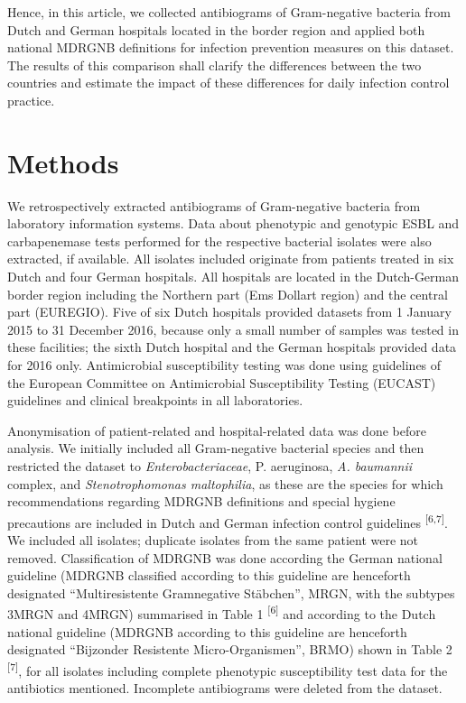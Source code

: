 \documentclass[
]{book}
\begin{document}
Hence, in this article, we collected antibiograms of Gram-negative bacteria from Dutch and German hospitals located in the border region and applied both national MDRGNB definitions for infection prevention measures on this dataset. The results of this comparison shall clarify the differences between the two countries and estimate the impact of these differences for daily infection control practice.

\hypertarget{methods-2}{%
\section{Methods}\label{methods-2}}

We retrospectively extracted antibiograms of Gram-negative bacteria from laboratory information systems. Data about phenotypic and genotypic ESBL and carbapenemase tests performed for the respective bacterial isolates were also extracted, if available. All isolates included originate from patients treated in six Dutch and four German hospitals. All hospitals are located in the Dutch-German border region including the Northern part (Ems Dollart region) and the central part (EUREGIO). Five of six Dutch hospitals provided datasets from 1 January 2015 to 31 December 2016, because only a small number of samples was tested in these facilities; the sixth Dutch hospital and the German hospitals provided data for 2016 only. Antimicrobial susceptibility testing was done using guidelines of the European Committee on Antimicrobial Susceptibility Testing (EUCAST) guidelines and clinical breakpoints in all laboratories.

Anonymisation of patient-related and hospital-related data was done before analysis. We initially included all Gram-negative bacterial species and then restricted the dataset to \emph{Enterobacteriaceae}, P. aeruginosa, \emph{A. baumannii} complex, and \emph{Stenotrophomonas maltophilia}, as these are the species for which recommendations regarding MDRGNB definitions and special hygiene precautions are included in Dutch and German infection control guidelines \textsuperscript{{[}6,7{]}}. We included all isolates; duplicate isolates from the same patient were not removed. Classification of MDRGNB was done according the German national guideline (MDRGNB classified according to this guideline are henceforth designated ``Multiresistente Gramnegative Stäbchen'', MRGN, with the subtypes 3MRGN and 4MRGN) summarised in Table 1 \textsuperscript{{[}6{]}} and according to the Dutch national guideline (MDRGNB according to this guideline are henceforth designated ``Bijzonder Resistente Micro-Organismen'', BRMO) shown in Table 2 \textsuperscript{{[}7{]}}, for all isolates including complete phenotypic susceptibility test data for the antibiotics mentioned. Incomplete antibiograms were deleted from the dataset.
\end{document}
